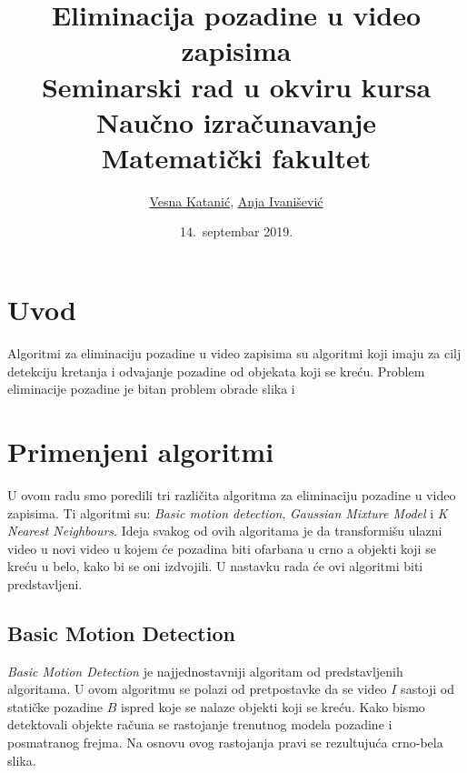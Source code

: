 \documentclass[a4paper]{article}
\begin{document}
\title{Eliminacija pozadine u video zapisima\\ \small{Seminarski rad u okviru kursa\\Naučno izračunavanje\\ Matematički fakultet}}

\author{\href{mailto:mi14097@matf.bg.ac.rs}{Vesna Katanić}, \href{mailto:mi14022@matf.bg.ac.rs}{Anja Ivanišević}}
\date{14.~septembar 2019.}
\maketitle

\tableofcontents

\newpage

\section{Uvod}
\label{sec:uvod}

Algoritmi za eliminaciju pozadine u video zapisima su algoritmi koji imaju za cilj detekciju kretanja i odvajanje pozadine od objekata koji se kreću. Problem eliminacije pozadine je bitan problem obrade slika i 


\section{Primenjeni algoritmi}
\label{sec:algoritmi}

U ovom radu smo poredili tri različita algoritma za eliminaciju pozadine u video zapisima. Ti algoritmi su: \emph{Basic motion detection}, \emph{Gaussian Mixture Model} i \emph{K Nearest Neighbours}. Ideja svakog od ovih algoritama je da transformišu ulazni video u novi video u kojem će pozadina biti ofarbana u crno a objekti koji se kreću u belo, kako bi se oni izdvojili. U nastavku rada će ovi algoritmi biti predstavljeni.

\subsection{Basic Motion Detection}

\emph{Basic Motion Detection} je najjednostavniji algoritam od predstavljenih algoritama. U ovom algoritmu se polazi od pretpostavke da se video $I$ sastoji od statičke pozadine $B$ ispred koje se nalaze objekti koji se kreću. Kako bismo detektovali objekte računa se rastojanje trenutnog modela pozadine i posmatranog frejma. Na osnovu ovog rastojanja pravi se rezultujuća crno-bela slika. 
\end{document}
